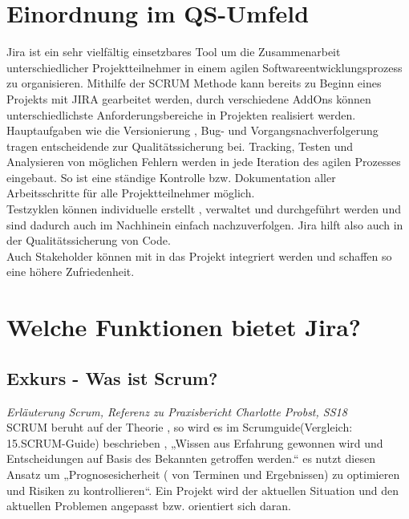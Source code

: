 \documentclass[a4paper, 10pt]{scrartcl}
\begin{document}
\section{Einordnung im QS-Umfeld}
Jira ist ein sehr vielfältig einsetzbares Tool um die Zusammenarbeit unterschiedlicher Projektteilnehmer in einem agilen Softwareentwicklungsprozess zu organisieren. 
Mithilfe der SCRUM Methode kann bereits zu Beginn eines Projekts mit JIRA gearbeitet werden, durch verschiedene AddOns können unterschiedlichste Anforderungsbereiche in Projekten realisiert werden.\\
Hauptaufgaben wie die Versionierung , Bug- und Vorgangsnachverfolgerung tragen entscheidende zur Qualitätssicherung bei. Tracking, Testen und Analysieren von möglichen Fehlern werden in jede Iteration des agilen Prozesses eingebaut.
So ist eine ständige Kontrolle bzw. Dokumentation aller Arbeitsschritte für alle Projektteilnehmer möglich. \\
Testzyklen können individuelle erstellt , verwaltet und durchgeführt werden und sind dadurch auch im Nachhinein einfach nachzuverfolgen. Jira hilft also auch in der Qualitätssicherung von Code.\\
Auch Stakeholder können mit in das Projekt integriert werden und schaffen so eine höhere Zufriedenheit.

\section{Welche Funktionen bietet Jira?}

\subsection{Exkurs - Was ist Scrum?}

\textit{Erläuterung Scrum, Referenz zu Praxisbericht Charlotte Probst, SS18}\\

SCRUM beruht auf der Theorie , so wird es im  Scrumguide(Vergleich: 15.SCRUM-Guide) beschrieben , „Wissen aus Erfahrung gewonnen wird und Entscheidungen auf Basis des Bekannten getroffen werden.“ es nutzt diesen Ansatz um „Prognosesicherheit ( von Terminen und Ergebnissen) zu optimieren und Risiken zu kontrollieren“. Ein Projekt wird der aktuellen Situation und den aktuellen Problemen angepasst bzw. orientiert sich daran. 
\end{document}
